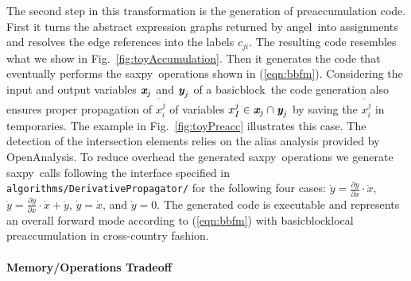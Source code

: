 \documentclass[11pt]{article}
\newcommand{\angel}{angel}
\newcommand{\basicblock}{basicblock}
\newcommand{\OpenAnalysis}{OpenAnalysis}
\newcommand{\saxpy}{saxpy}
\newcommand{\bmx}{\mbox{\bf\em x}}
\newcommand{\bmy}{\mbox{\bf\em y}}
\newcommand{\code}[1]{{\small\tt{#1}}}
\newcommand{\reffig}[1]{{Fig.~\ref{#1}}}
\newcommand{\refeqn}[1]{{(\ref{#1})}}
\begin{document}
The second step in this transformation is the generation of 
preaccumulation code. 
First it  turns the abstract expression graphs returned by \angel\ 
into assignments and resolves the edge references into 
the  labels $c_{ji}$. The resulting code resembles what 
we show in  \reffig{fig:toyAccumulation}. 
Then it generates the code that eventually performs the \saxpy\ 
operations shown in \refeqn{eqn:bbfm}. 
Considering the input and output variables $\bmx_j$ and $\bmy_j$ of a \basicblock\ the code generation 
also ensures proper propagation of $\dot{x_i^j}$ of variables $ x_I^j \in  \bmx_j \cap \bmy_j$ 
by saving the $\dot{x_i^j}$ in temporaries. The example in \reffig{fig:toyPreacc} illustrates this case. 
The detection of the intersection elements relies on the alias analysis provided by 
\OpenAnalysis.
To reduce overhead 
the generated \saxpy\ operations we generate \saxpy\ calls following the 
interface specified in \code{algorithms/DerivativePropagator/} for the following four cases:  
$\dot{y} = \frac{\partial y }{\partial x }\cdot \dot{x}$, 
$\dot{y} = \frac{\partial y }{\partial x }\cdot \dot{x} + \dot{y}$, 
$\dot{y} = \dot{x}$, and 
$\dot{y} = 0$.	
The generated code is executable and represents an overall forward mode 
according to \refeqn{eqn:bbfm} with \basicblock\-local preaccumulation in 
cross-country fashion. 

\paragraph{Memory/Operations Tradeoff}\label{sssec:MMTradeOff}
\end{document}
